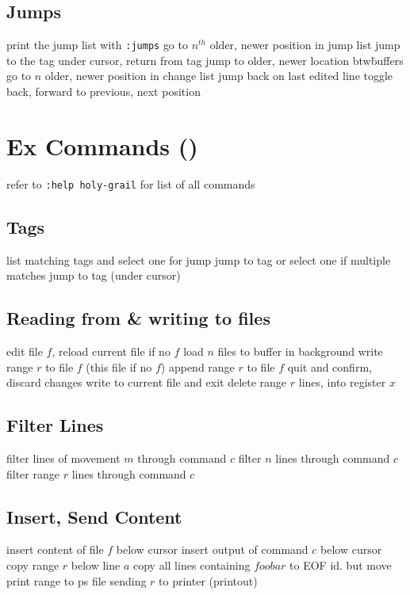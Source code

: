 \subsection{Jumps}	{print the jump list with {\tt :jumps}}
	{go to $n^{th}$ older, newer position in jump list}
\cmdS{\ctrl ] \ctrl T }	{jump to the tag under cursor, return from tag}
	{jump to older, newer location btw\. buffers}
	{go to $n$ older, newer position in change list}
	{jump back on last edited line}
	{toggle back, forward to previous, next position}

\section{Ex Commands (\enter)}	{refer to {\tt :help holy-grail} for list of all commands}
\subsection{Tags}	{}
	{list matching tags and select one for jump}
	{jump to tag or select one if multiple matches}
\cmdS{:ta\grey{g} \ctrl[ }	{jump to tag (under cursor)}

\subsection{Reading from \& writing to files}	{}
	{edit file $f$, reload current file if no $f$}
	{load $n$ files to buffer in background}
	{write range $r$ to file $f$ (this file if no $f$)}
	{append range $r$ to file $f$}
	{quit and confirm, discard changes}
	{write to current file and exit}
	{delete range $r$ lines, into register $x$}

\subsection{Filter Lines}{}
	{filter lines of movement $m$ through command $c$}
	{filter $n$ lines through command $c$}
	{filter range $r$ lines through command $c$}

\subsection{Insert, Send Content}	{}
	{insert content of file $f$ below cursor}
	{insert output of command $c$ below cursor}
	{copy range $r$ below line $a$}
	{copy all lines containing $foobar$ to EOF}
	{id. but move}
	{print range to ps file}
	{sending $r$ to printer (printout)}

